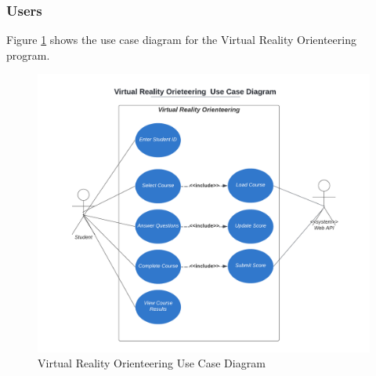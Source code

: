 \subsubsection{Users}
Figure \ref{Virutal Reality Orienteering Use Case Diagram} shows the use case diagram for the Virtual Reality Orienteering program.

\begin{figure}[h]
	\centering
	\includegraphics[width=.9\textwidth]{Requirements/assets/vr-use-case-diagram.png}
	\caption[Virutal Reality Orienteering Use Case Diagram]{\label{Virutal Reality Orienteering Use Case Diagram}Virtual Reality Orienteering Use Case Diagram}
\end{figure}
\clearpage
